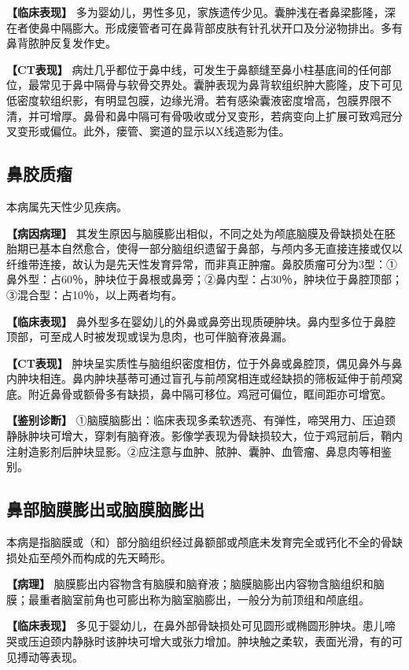 \textbf{【临床表现】}
多为婴幼儿，男性多见，家族遗传少见。囊肿浅在者鼻梁膨隆，深在者使鼻中隔膨大。形成瘘管者可在鼻背部皮肤有针孔状开口及分泌物排出。多有鼻背脓肿反复发作史。

\textbf{【CT表现】}
病灶几乎都位于鼻中线，可发生于鼻额缝至鼻小柱基底间的任何部位，最常见于鼻中隔骨与软骨交界处。囊肿表现为鼻背软组织肿大膨隆，皮下可见低密度软组织影，有明显包膜，边缘光滑。若有感染囊液密度增高，包膜界限不清，并可增厚。鼻骨和鼻中隔可有骨吸收或分叉变形，若病变向上扩展可致鸡冠分叉变形或偏位。此外，瘘管、窦道的显示以X线造影为佳。

\subsection{鼻胶质瘤}

本病属先天性少见疾病。

\textbf{【病因病理】}
其发生原因与脑膜膨出相似，不同之处为颅底脑膜及骨缺损处在胚胎期已基本自然愈合，使得一部分脑组织遗留于鼻部，与颅内多无直接连接或仅以纤维带连接，故认为是先天性发育异常，而非真正肿瘤。鼻胶质瘤可分为3型：①鼻外型：占60％，肿块位于鼻根或鼻旁；②鼻内型：占30％，肿块位于鼻腔顶部；③混合型：占10％，以上两者均有。

\textbf{【临床表现】}
鼻外型多在婴幼儿的外鼻或鼻旁出现质硬肿块。鼻内型多位于鼻腔顶部，可至成人时被发现或误为息肉，也可伴脑脊液鼻漏。

\textbf{【CT表现】}
肿块呈实质性与脑组织密度相仿，位于外鼻或鼻腔顶，偶见鼻外与鼻内肿块相连。鼻内肿块基蒂可通过盲孔与前颅窝相连或经缺损的筛板延伸于前颅窝底。附近鼻骨或额骨多有缺损，鼻中隔可移位。鸡冠可偏位，眶间距亦可增宽。

\textbf{【鉴别诊断】}
①脑膜脑膨出：临床表现多柔软透亮、有弹性，啼哭用力、压迫颈静脉肿块可增大，穿刺有脑脊液。影像学表现为骨缺损较大，位于鸡冠前后，鞘内注射造影剂后肿块显影。②应注意与血肿、脓肿、囊肿、血管瘤、鼻息肉等相鉴别。

\subsection{鼻部脑膜膨出或脑膜脑膨出}

本病是指脑膜或（和）部分脑组织经过鼻额部或颅底未发育完全或钙化不全的骨缺损处疝至颅外而构成的先天畸形。

\textbf{【病理】}
脑膜膨出内容物含有脑膜和脑脊液；脑膜脑膨出内容物含脑组织和脑膜；最重者脑室前角也可膨出称为脑室脑膨出，一般分为前顶组和颅底组。

\textbf{【临床表现】}
多见于婴幼儿，在鼻外部骨缺损处可见圆形或椭圆形肿块。患儿啼哭或压迫颈内静脉时该肿块可增大或张力增加。肿块触之柔软，表面光滑，有的可见搏动等表现。

